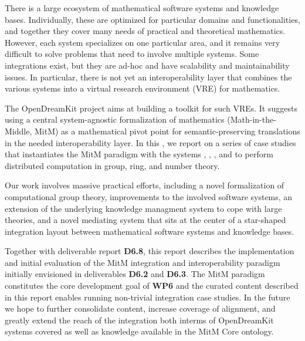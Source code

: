 There is a large ecosystem of mathematical software systems and knowledge bases.
Individually, these are optimized for particular domains and functionalities, and together they cover many needs of practical and theoretical mathematics.
However, each system specializes on one particular area, and it remains very difficult to solve problems that need to involve multiple systems.
Some integrations exist, but they are ad-hoc and have scalability and maintainability issues.
In particular, there is not yet an interoperability layer that combines the various systems into a virtual research environment (VRE) for mathematics.
  
The OpenDreamKit project aims at building a toolkit for such VREs.
It suggests using a central system-agnostic formalization of mathematics (Math-in-the-Middle, MitM) as a mathematical pivot point for semantic-preserving translations in the needed interoperability layer.
In this \papertype, we report on a series of case studies that instantiates the MitM paradigm with the systems \GAP, \Sage, \LMFDB, and \Singular to perform distributed computation in group, ring, and number theory.
 
Our work involves massive practical efforts, including a novel formalization of computational group theory, improvements to the involved software systems, an extension of the underlying knowledge managment system to cope with large theories, and a novel mediating system that sits at the center of a star-shaped integration layout between mathematical software systems and knowledge bases.

Together with deliverable report \textbf{D6.8}, this report describes the implementation and initial evaluation of the MitM integration and interoperability paradigm initially envisioned in deliverables \textbf{D6.2} and \textbf{D6.3}.
The MitM paradigm constitutes the core development goal of \textbf{WP6} and the curated content described in this report enables running non-trivial integration case studies.
In the future we hope to further consolidate content, increase coverage of alignment, and greatly extend the reach of the integration both interms of OpenDreamKit systems covered as well as knowledge available in the MitM Core ontology.

